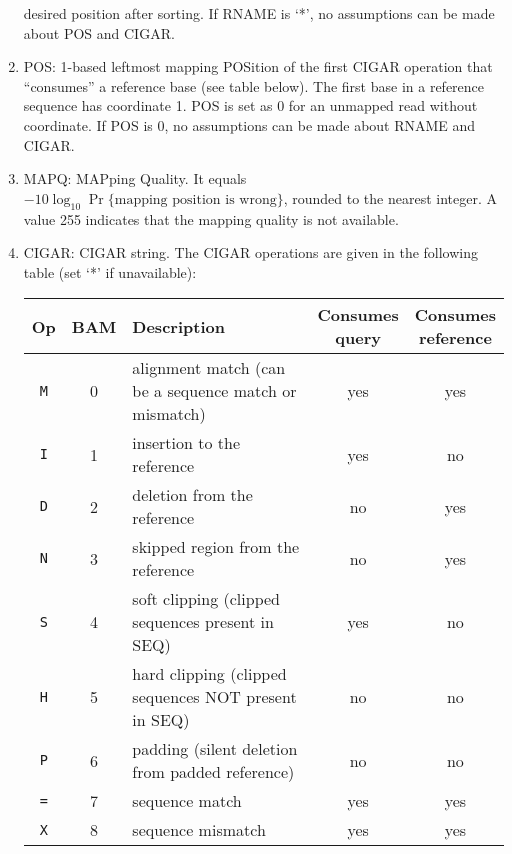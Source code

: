 \documentclass[10pt]{article}
\begin{document}
\begin{enumerate}
  desired position after sorting. If {\sf RNAME} is `*', no assumptions
  can be made about {\sf POS} and {\sf CIGAR}.
\item {\sf POS}: 1-based leftmost mapping POSition of the first {\sf
    CIGAR} operation that ``consumes'' a reference base (see table below).
    The first base in a reference sequence has coordinate 1. {\sf
    POS} is set as 0 for an unmapped read without coordinate. If {\sf
    POS} is 0, no assumptions can be made about {\sf RNAME} and {\sf
    CIGAR}.
\item {\sf MAPQ}: MAPping Quality. It equals
  $-10\log_{10}\Pr\{\mbox{mapping position is wrong}\}$, rounded to the
  nearest integer. A value 255 indicates that the mapping quality is not
  available.
\item {\sf CIGAR}: CIGAR string. The CIGAR operations are given in the
  following table (set `*' if unavailable):
  \begin{center}\small
  \begin{tabular}{cclcc}
  \hline
  Op & BAM & Description & \makecell{Consumes \\ query} & \makecell{Consumes \\ reference}\\
  \hline
  {\tt M} & 0 & alignment match (can be a sequence match or mismatch)       & yes & yes \\
  {\tt I} & 1 & insertion to the reference                                  & yes & no  \\
  {\tt D} & 2 & deletion from the reference                                 & no  & yes \\
  {\tt N} & 3 & skipped region from the reference                           & no  & yes \\
  {\tt S} & 4 & soft clipping (clipped sequences present in {\sf SEQ})      & yes & no  \\
  {\tt H} & 5 & hard clipping (clipped sequences NOT present in {\sf SEQ})  & no  & no  \\
  {\tt P} & 6 & padding (silent deletion from padded reference)             & no  & no  \\
  {\tt =} & 7 & sequence match                                              & yes & yes \\
  {\tt X} & 8 & sequence mismatch                                           & yes & yes \\
  \hline
  \end{tabular}
  \end{center}
  \begin{itemize}

\end{itemize}
\end{enumerate}
\end{document}
